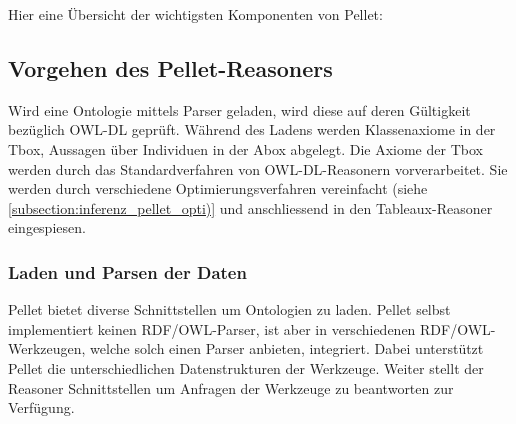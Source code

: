 Hier eine Übersicht der wichtigsten Komponenten von Pellet:
\begin{table}[H]
\centering
{}\hfill
{}
\end{table}


\subsection{Vorgehen des Pellet-Reasoners}
\label{subsection:inferenz_pellet_vorgehen}
Wird eine Ontologie mittels Parser geladen, wird diese auf deren Gültigkeit bezüglich OWL-DL geprüft. Während des Ladens werden Klassenaxiome in der Tbox, Aussagen über Individuen in der Abox abgelegt. Die Axiome der Tbox werden durch das Standardverfahren von OWL-DL-Reasonern vorverarbeitet. Sie werden durch verschiedene Optimierungsverfahren vereinfacht (siehe \ref{subsection:inferenz_pellet_opti)} und anschliessend in den Tableaux-Reasoner eingespiesen.

\subsubsection{Laden und Parsen der Daten}
\label{ssubsection:inferenz_pellet_parsing}
Pellet bietet diverse Schnittstellen um Ontologien zu laden. Pellet selbst implementiert keinen RDF/OWL-Parser, ist aber in verschiedenen RDF/OWL-Werkzeugen, welche solch einen Parser anbieten, integriert. Dabei unterstützt Pellet die unterschiedlichen Datenstrukturen der Werkzeuge. Weiter stellt der Reasoner Schnittstellen um Anfragen der Werkzeuge zu beantworten zur Verfügung.

